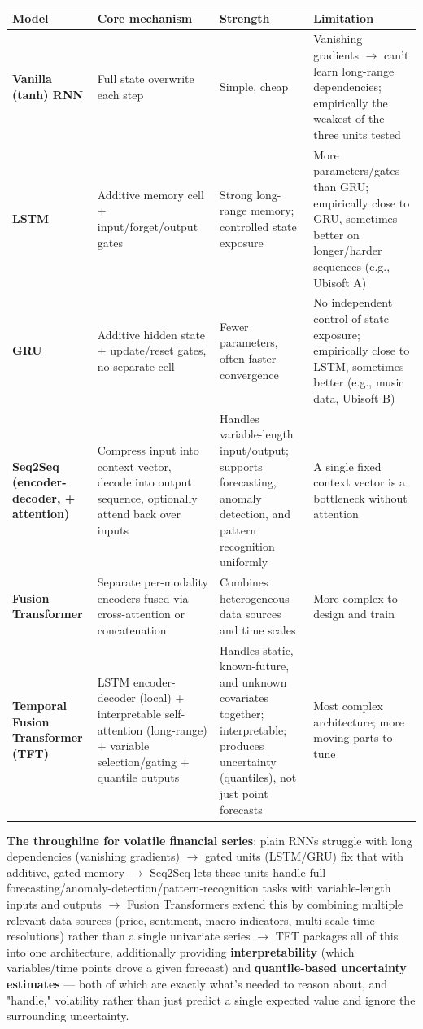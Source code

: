 \documentclass[12pt,openany]{book}
\theoremstyle{definition}
\theoremstyle{remark}
\begin{document}
{\small
\setlength{\tabcolsep}{3pt}
\begin{longtable}{@{}L{0.20\textwidth}L{0.22\textwidth}L{0.22\textwidth}L{0.30\textwidth}@{}}
\toprule
Model & Core mechanism & Strength & Limitation \\
\midrule
\textbf{Vanilla (tanh) RNN} & Full state overwrite each step & Simple, cheap & Vanishing gradients \ensuremath{\rightarrow} can't learn long-range dependencies; empirically the weakest of the three units tested \\
\textbf{LSTM} & Additive memory cell + input/forget/output gates & Strong long-range memory; controlled state exposure & More parameters/gates than GRU; empirically close to GRU, sometimes better on longer/harder sequences (e.g., Ubisoft A) \\
\textbf{GRU} & Additive hidden state + update/reset gates, no separate cell & Fewer parameters, often faster convergence & No independent control of state exposure; empirically close to LSTM, sometimes better (e.g., music data, Ubisoft B) \\
\textbf{Seq2Seq (encoder-decoder, + attention)} & Compress input into context vector, decode into output sequence, optionally attend back over inputs & Handles variable-length input/output; supports forecasting, anomaly detection, and pattern recognition uniformly & A single fixed context vector is a bottleneck without attention \\
\textbf{Fusion Transformer} & Separate per-modality encoders fused via cross-attention or concatenation & Combines heterogeneous data sources and time scales & More complex to design and train \\
\textbf{Temporal Fusion Transformer (TFT)} & LSTM encoder-decoder (local) + interpretable self-attention (long-range) + variable selection/gating + quantile outputs & Handles static, known-future, and unknown covariates together; interpretable; produces uncertainty (quantiles), not just point forecasts & Most complex architecture; more moving parts to tune \\
\bottomrule
\end{longtable}
}

\textbf{The throughline for volatile financial series}: plain RNNs struggle with long dependencies (vanishing gradients) \ensuremath{\rightarrow} gated units (LSTM/GRU) fix that with additive, gated memory \ensuremath{\rightarrow} Seq2Seq lets these units handle full forecasting/anomaly-detection/pattern-recognition tasks with variable-length inputs and outputs \ensuremath{\rightarrow} Fusion Transformers extend this by combining multiple relevant data sources (price, sentiment, macro indicators, multi-scale time resolutions) rather than a single univariate series \ensuremath{\rightarrow} TFT packages all of this into one architecture, additionally providing \textbf{interpretability} (which variables/time points drove a given forecast) and \textbf{quantile-based uncertainty estimates} --- both of which are exactly what's needed to reason about, and "handle," volatility rather than just predict a single expected value and ignore the surrounding uncertainty.
\end{document}
